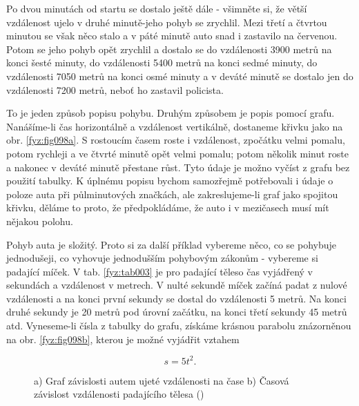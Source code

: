     Po dvou minutách od startu se dostalo ještě dále - všimněte si, že větší vzdálenost ujelo v 
    druhé minutě-jeho pohyb se zrychlil. Mezi třetí a čtvrtou minutou se však něco stalo a v páté 
    minutě auto snad i zastavilo na červenou. Potom se jeho pohyb opět zrychlil a dostalo se do 
    vzdálenosti \num{3900} metrů na konci šesté minuty, do vzdálenosti \num{5400} metrů na konci 
    sedmé minuty, do vzdálenosti \num{7050} metrů na konci osmé minuty a v deváté minutě se dostalo 
    jen do vzdálenosti \num{7200} metrů, neboť ho zastavil policista.

    To je jeden způsob popisu pohybu. Druhým způsobem je popis pomocí grafu. Nanášíme-li čas 
    horizontálně a vzdálenost vertikálně, dostaneme křivku jako na obr. \ref{fyz:fig098a}. S 
    rostoucím časem roste i vzdálenost, zpočátku velmi pomalu, potom rychleji a ve čtvrté minutě 
    opět velmi pomalu; potom několik minut roste a nakonec v deváté minutě přestane růst. Tyto 
    údaje je možno vyčíst z grafu bez použití tabulky. K úplnému popisu bychom samozřejmě 
    potřebovali i údaje o poloze auta při půlminutových značkách, ale zakreslujeme-li graf jako 
    spojitou křivku, děláme to proto, že předpokládáme, že auto i v mezičasech musí mít nějakou 
    polohu.
    
    Pohyb auta je složitý. Proto si za další příklad vybereme něco, co se pohybuje jednodušeji, co 
    vyhovuje jednodušším pohybovým zákonům - vybereme si padající míček. V tab. \ref{fyz:tab003} je 
    pro padající těleso čas vyjádřený v sekundách a vzdálenost v metrech. V nulté sekundě míček 
    začíná padat z nulové vzdálenosti a na konci první sekundy se dostal do vzdálenosti \num{5} 
    metrů. Na konci druhé sekundy je \num{20} metrů pod úrovní začátku, na konci třetí sekundy 
    \num{45} metrů atd. Vyneseme-li čísla z tabulky do grafu, získáme krásnou parabolu znázorněnou 
    na obr. \ref{fyz:fig098b}, kterou je možné vyjádřit vztahem
    
    \begin{equation}\label{fyz:eq111}
      s = 5t^2.
    \end{equation}
  
    \begin{figure}[ht!]  %
      \centering
                    \newline                                                   
      \caption{a) Graf závislosti autem ujeté vzdálenosti na čase b) Časová závislost vzdálenosti 
               padajícího tělesa (\cite[s.~109]{Feynman01})}
      \label{fyz:fig098}
    \end{figure}


